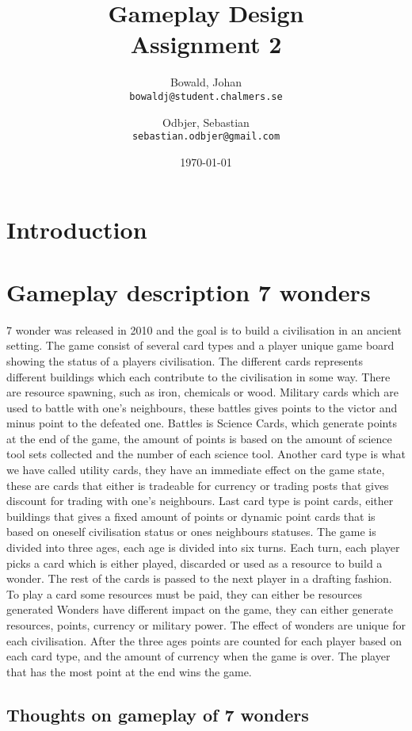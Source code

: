 \documentclass[a4paper]{article}
\title{Gameplay Design \\ Assignment 2 }
\author{
  Bowald, Johan\\
  \texttt{bowaldj@student.chalmers.se}
  \and
  Odbjer, Sebastian\\
  \texttt{sebastian.odbjer@gmail.com}
}
\date{\today}
\begin{document}
\maketitle
\newpage
\tableofcontents{}
\newpage
\section{Introduction}

\section{Gameplay description 7 wonders}
\label{sec:what7wond}
7 wonder was released in 2010 and the goal is to build a civilisation in an ancient setting. 
The game consist of several card types and a player unique game board showing the status of a players civilisation. The different cards represents different buildings which each contribute to the civilisation in some way. There are resource spawning, such as iron, chemicals or wood. Military cards which are used to battle with one's neighbours, these battles gives points to the victor and minus point to the defeated one. Battles is Science Cards, which generate points at the end of the game, the amount of points is based on the amount of science tool sets collected and the number of each science tool.
Another card type is what we have called utility cards, they have an immediate effect on the game state, these are cards that either is tradeable for currency or trading posts that gives discount for trading with one's neighbours. Last card type is point cards, either buildings that gives a fixed amount of points or dynamic point cards that is based on oneself civilisation status or ones neighbours statuses. The game is divided into three ages, each age is divided into six turns. Each turn, each player picks a card which is either played, discarded or used as a resource to build a wonder. The rest of the cards is passed to the next player in a drafting fashion. To play a card some resources must be paid, they can either be resources generated Wonders have different impact on the game, they can either generate resources, points, currency or military power. The effect of wonders are unique for each civilisation. After the three ages points are counted for each player based on each card type, and the amount of currency when the game is over. The player that has the most point at the end wins the game. 

\subsection{Thoughts on gameplay of 7 wonders}
\label{sec:thoughtsGP7wond}
\end{document}
